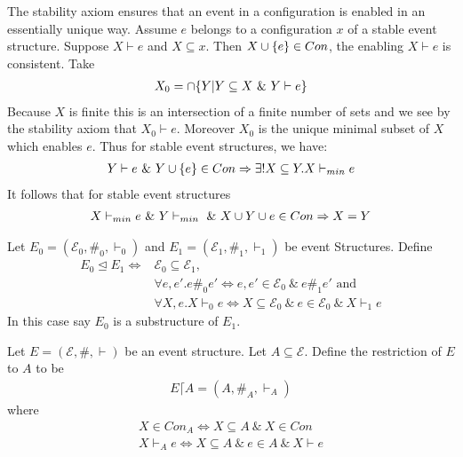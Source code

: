 The stability axiom ensures that an event in a configuration is
enabled in an essentially unique way.
Assume $e$ belongs to a configuration $x$ of a stable event structure.
Suppose $X \vdash e$ and $X \subseteq x$.
Then $X \cup \{e\} \in Con$, the enabling $X\vdash e$ is consistent.
Take
\begin{align*}
    X_0 = \cap \{Y | Y \subseteq X \ \& \  Y \vdash e\}
\end{align*}
Because $X$ is finite this is an intersection of a finite number of
sets and we see by the stability axiom that $X_0 \vdash e$.
Moreover $X_0$ is the unique minimal subset of $X$ which enables $e$.
Thus for stable event structures, we have:
\begin{align*}
    Y \vdash e \ \& \  Y \cup \{e\} \in Con \Rightarrow
    \exists ! X \subseteq Y.X \vdash_{min} e
\end{align*}
It follows that for stable event structures
\begin{align*}
    X \vdash_{min} e \ \& \  Y \vdash_{min} \ \& \ 
    X \cup Y \cup e \in Con \Rightarrow X = Y
\end{align*}
\begin{definition}
    Let $E_0 = (\mathcal{E}_0,\#_0,\vdash_0)$ and $E_1 = (\mathcal{E}_1,\#_1,\vdash_1)$
    be event Structures. Define
    \begin{align*}
        E_0 \trianglelefteq E_1 \iff & \mathcal{E}_0 \subseteq \mathcal{E}_1,                                          \\
                                     & \forall e,e'. e\#_0e'  \iff e,e' \in \mathcal{E}_0 \ \& \ e\#_1 e' \text{ and } \\
                                     & \forall X,e.X\vdash_0 e  \iff X \subseteq \mathcal{E}_0
        \ \& \ e \in \mathcal{E}_0\ \& \ X \vdash_1 e
    \end{align*}
    In this case say $E_0$ is a substructure of $E_1$.
\end{definition}

\begin{definition}[Restriction]
    Let $E = (\mathcal{E},\#,\vdash)$ be an event structure.
    Let $A \subseteq \mathcal{E}$.
    Define the restriction of $E$ to $A$ to be
    \begin{align*}
        E \lceil A = (A,\#_A,\vdash_A)
    \end{align*}
    where
    \begin{align*}
        X \in Con_A \iff X \subseteq A \ \& \ X \in Con \\
        X \vdash_A e \iff X \subseteq A \ \& \ e \in A \ \& \ X \vdash e
    \end{align*}
\end{definition}

